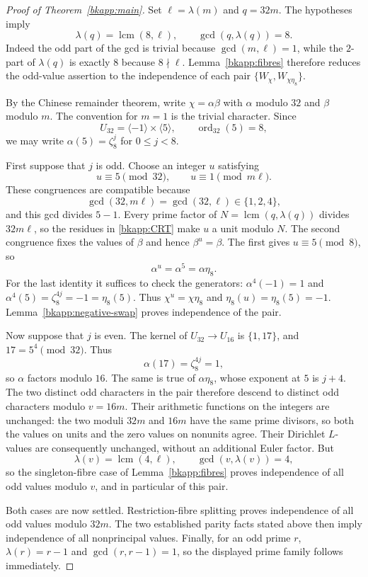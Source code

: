 \documentclass[11pt,a4paper]{article}
\theoremstyle{definition}
\theoremstyle{remark}
\begin{document}
\begin{proof}[Proof of Theorem~\ref{bkapp:main}]
Set $\ell=\lambda(m)$ and $q=32m$.
The hypotheses imply
\[
 \lambda(q)=\operatorname{lcm}(8,\ell),
 \qquad \gcd(q,\lambda(q))=8.
\]
Indeed the odd part of the gcd is trivial because
$\gcd(m,\ell)=1$, while the $2$-part of $\lambda(q)$ is exactly
$8$ because $8\nmid\ell$.
Lemma~\ref{bkapp:fibres} therefore reduces the odd-value assertion
to the independence of each pair $\{W_\chi,W_{\chi\eta_8}\}$.

By the Chinese remainder theorem, write
$\chi=\alpha\beta$ with $\alpha$ modulo $32$ and $\beta$ modulo
$m$.  The convention for $m=1$ is the trivial character.
Since
\[
 U_{32}=\langle-1\rangle\times\langle5\rangle,
 \qquad \operatorname{ord}_{32}(5)=8,
\]
we may write $\alpha(5)=\zeta_8^j$ for $0\leq j<8$.

First suppose that $j$ is odd.  Choose an integer $u$ satisfying
\begin{equation}
\label{bkapp:CRT}
 u\equiv5\pmod{32},
 \qquad u\equiv1\pmod{m\ell}.
\end{equation}
These congruences are compatible because
\[
 \gcd(32,m\ell)=\gcd(32,\ell)\in\{1,2,4\},
\]
and this gcd divides $5-1$.
Every prime factor of $N=\operatorname{lcm}(q,\lambda(q))$
divides $32m\ell$, so the residues in \eqref{bkapp:CRT} make $u$
a unit modulo $N$.
The second congruence fixes the values of $\beta$ and hence
$\beta^u=\beta$.  The first gives $u\equiv5\pmod8$, so
\[
 \alpha^u=\alpha^5=\alpha\eta_8.
\]
For the last identity it suffices to check the generators:
$\alpha^4(-1)=1$ and
$\alpha^4(5)=\zeta_8^{4j}=-1=\eta_8(5)$.
Thus $\chi^u=\chi\eta_8$ and
$\eta_8(u)=\eta_8(5)=-1$.
Lemma~\ref{bkapp:negative-swap} proves independence of the pair.

Now suppose that $j$ is even.  The kernel of
$U_{32}\longrightarrow U_{16}$ is $\{1,17\}$, and
$17=5^4\pmod{32}$.  Thus
\[
 \alpha(17)=\zeta_8^{4j}=1,
\]
so $\alpha$ factors modulo $16$.  The same is true of
$\alpha\eta_8$, whose exponent at $5$ is $j+4$.
The two distinct odd characters in the pair therefore descend to
distinct odd characters modulo $v=16m$.  Their arithmetic functions
on the integers are unchanged: the two moduli $32m$ and $16m$ have
the same prime divisors, so both the values on units and the zero
values on nonunits agree.  Their Dirichlet $L$-values are consequently
unchanged, without an additional Euler factor.
But
\[
 \lambda(v)=\operatorname{lcm}(4,\ell),
 \qquad \gcd(v,\lambda(v))=4,
\]
so the singleton-fibre case of Lemma~\ref{bkapp:fibres} proves
independence of all odd values modulo $v$, and in particular of this
pair.

Both cases are now settled.  Restriction-fibre splitting proves
independence of all odd values modulo $32m$.  The two established
parity facts stated above then imply independence of all
nonprincipal values.  Finally, for an odd prime $r$,
$\lambda(r)=r-1$ and $\gcd(r,r-1)=1$, so the displayed prime family
follows immediately.
\end{proof}
\end{document}
